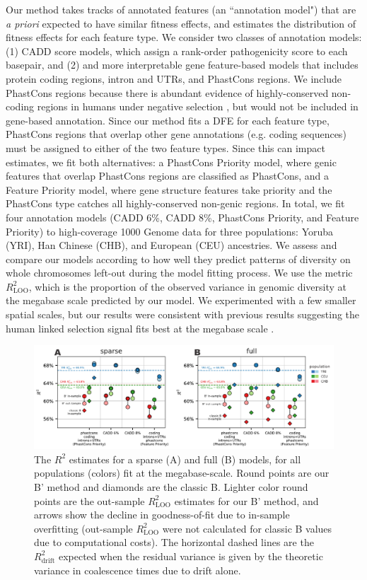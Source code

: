 \documentclass[11pt]{article}
\begin{document}
Our method takes tracks of annotated features (an ``annotation model") that are
\emph{a priori} expected to have similar fitness effects, and estimates the
distribution of fitness effects for each feature type. We consider two classes
of annotation models: (1) CADD score models, which assign a rank-order
pathogenicity score to each basepair, and (2) and more interpretable gene
feature-based models that includes protein coding regions, intron and UTRs, and
PhastCons regions. We include PhastCons regions because there is abundant
evidence of highly-conserved non-coding regions in humans under negative
selection
\parencite{Meader2010-hm,Harmston2013-tt,Katzman2007-gq,Siepel2005-wh}, but
would not be included in gene-based annotation. Since our method fits a DFE for
each feature type, PhastCons regions that overlap other gene annotations (e.g.
coding sequences) must be assigned to either of the two feature types. Since
this can impact estimates, we fit both alternatives: a PhastCons Priority
model, where genic features that overlap PhastCons regions are classified as
PhastCons, and a Feature Priority model, where gene structure features take
priority and the PhastCons type catches all highly-conserved non-genic regions.
In total, we fit four annotation models (CADD 6\%, CADD 8\%, PhastCons
Priority, and Feature Priority) to high-coverage 1000 Genome data for three
populations: Yoruba (YRI), Han Chinese (CHB), and European (CEU) ancestries. We
assess and compare our models according to how well they predict patterns of
diversity on whole chromosomes left-out during the model fitting process. We
use the metric $R_\text{LOO}^2$, which is the proportion of the observed
variance in genomic diversity at the megabase scale predicted by our model. We
experimented with a few smaller spatial scales, but our results were consistent
with previous results suggesting the human linked selection signal fits best at
the megabase scale \parencite{Murphy2022-sj}.

\begin{figure}[htbp] \centering
    \includegraphics[width=\textwidth]{figures/figure_2.pdf} 
    \caption{The $R^2$ estimates for a sparse (A) and full (B) models, for all 
    populations (colors) fit at the megabase-scale. Round points are our B' 
    method and diamonds are the classic B. Lighter color round points are
    the out-sample $R_\text{LOO}^2$ estimates for our B' method, and arrows show the decline
    in goodness-of-fit due to in-sample overfitting (out-sample $R_\text{LOO}^2$ 
    were not calculated for classic B values due to computational costs). The 
    horizontal dashed lines are the $R_\text{drift}^2$ expected when the residual
    variance is given by the theoretic variance in coalescence times due to drift alone.}
  \label{fig:figure-2}
\end{figure}
\end{document}
